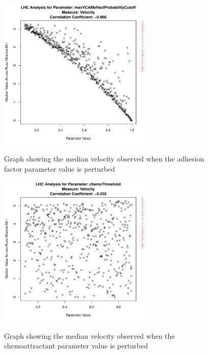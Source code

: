 \documentclass[a4paper,11pt]{article}
\begin{document}
\newpage 
\begin{figure}[h!]
\centering
    \includegraphics[width=0.65\textwidth]{LHC_maxVCAMeffectProbabilityCutoff_Velocity.pdf}\\ \noindent
    \caption{Graph showing the median velocity observed when the adhesion factor parameter value is perturbed}
    \label{LHC_Results1}
    \end{figure}

\begin{figure}[h!]
\centering
    \includegraphics[width=0.65\textwidth]{LHC_chemoThreshold_Velocity.pdf}\\ \noindent
    \caption{Graph showing the median velocity observed when the chemoattractant parameter value is perturbed}
    \label{LHC_Results2}
\end{figure}
\end{document}
